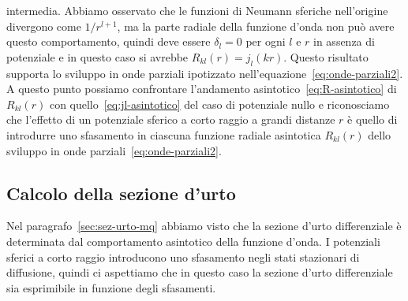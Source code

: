 \documentclass[a4paper,fleqn,twoside,12pt]{article}
\begin{document}
intermedia.  Abbiamo osservato che le funzioni di Neumann sferiche nell'origine
divergono come $1/r^{l+1}$, ma la parte radiale della funzione d'onda non può
avere questo comportamento, quindi deve essere $\delta_{l} = 0$ per ogni $l$ e
$r$ in assenza di potenziale e in questo caso si avrebbe $R_{kl}(r) =
j_{l}(kr)$.
Questo risultato supporta lo sviluppo in onde parziali ipotizzato
nell'equazione~\eqref{eq:onde-parziali2}.  A questo punto possiamo confrontare
l'andamento asintotico~\eqref{eq:R-asintotico} di $R_{kl}(r)$ con
quello~\eqref{eq:jl-asintotico} del caso di potenziale nullo e riconosciamo che
l'effetto di un potenziale sferico a corto raggio a grandi distanze $r$ è quello
di introdurre uno sfasamento in ciascuna funzione radiale asintotica $R_{kl}(r)$
dello sviluppo in onde parziali~\eqref{eq:onde-parziali2}.

\subsection{Calcolo della sezione d'urto}
\label{sec:sez-urto-op}

Nel paragrafo~\ref{sec:sez-urto-mq} abbiamo visto che la sezione d'urto
differenziale è determinata dal comportamento asintotico della funzione d'onda.
I potenziali sferici a corto raggio introducono uno sfasamento negli stati
stazionari di diffusione, quindi ci aspettiamo che in questo caso la sezione
d'urto differenziale sia esprimibile in funzione degli sfasamenti.
\end{document}

